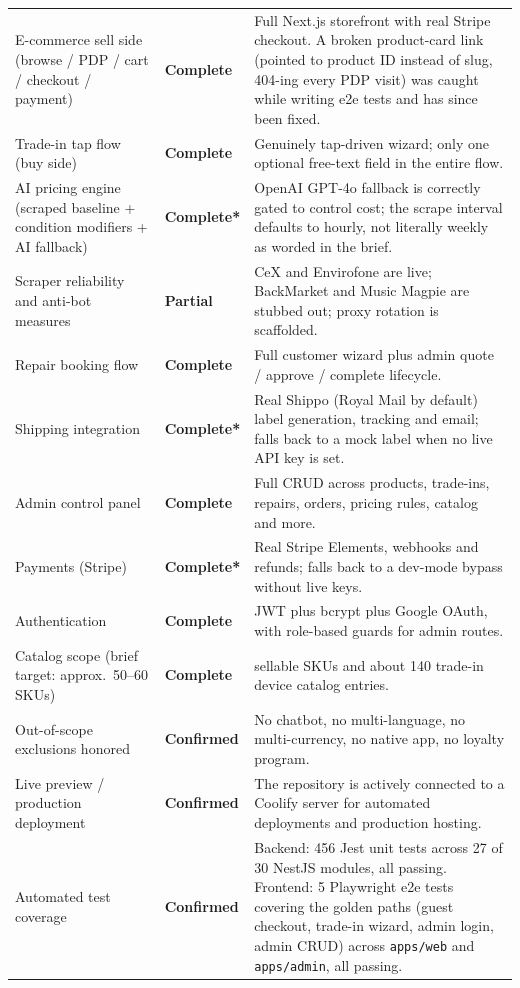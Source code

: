 \documentclass[11pt,a4paper]{article}
\newcommand{\stOK}{\textcolor{OKgreen}{\textbf{Complete}}}
\newcommand{\stOKc}{\textcolor{OKgreen}{\textbf{Complete*}}}
\newcommand{\stPartial}{\textcolor{Amber}{\textbf{Partial}}}
\newcommand{\stConfirmed}{\textcolor{OKgreen}{\textbf{Confirmed}}}
\begin{document}
\begin{longtable}{>{\raggedright\arraybackslash}p{5.0cm}
                   >{\centering\arraybackslash}p{2.2cm}
                   >{\raggedright\arraybackslash}p{7.4cm}}
E-commerce sell side (browse / PDP / cart / checkout / payment) & \stOK & Full Next.js storefront with real Stripe checkout. A broken product-card link (pointed to product ID instead of slug, 404-ing every PDP visit) was caught while writing e2e tests and has since been fixed. \\[4pt]
Trade-in tap flow (buy side) & \stOK & Genuinely tap-driven wizard; only one optional free-text field in the entire flow. \\[4pt]
AI pricing engine (scraped baseline + condition modifiers + AI fallback) & \stOKc & OpenAI GPT-4o fallback is correctly gated to control cost; the scrape interval defaults to hourly, not literally weekly as worded in the brief. \\[4pt]
Scraper reliability and anti-bot measures & \stPartial & CeX and Envirofone are live; BackMarket and Music Magpie are stubbed out; proxy rotation is scaffolded. \\[4pt]
Repair booking flow & \stOK & Full customer wizard plus admin quote / approve / complete lifecycle. \\[4pt]
Shipping integration & \stOKc & Real Shippo (Royal Mail by default) label generation, tracking and email; falls back to a mock label when no live API key is set. \\[4pt]
Admin control panel & \stOK & Full CRUD across products, trade-ins, repairs, orders, pricing rules, catalog and more. \\[4pt]
Payments (Stripe) & \stOKc & Real Stripe Elements, webhooks and refunds; falls back to a dev-mode bypass without live keys. \\[4pt]
Authentication & \stOK & JWT plus bcrypt plus Google OAuth, with role-based guards for admin routes. \\[4pt]
Catalog scope (brief target: approx.\ 50--60 SKUs) & \stOK & 118 sellable SKUs and about 140 trade-in device catalog entries. \\[4pt]
Out-of-scope exclusions honored & \stConfirmed & No chatbot, no multi-language, no multi-currency, no native app, no loyalty program. \\[4pt]
Live preview / production deployment & \stConfirmed & The repository is actively connected to a Coolify server for automated deployments and production hosting. \\[4pt]
Automated test coverage & \stConfirmed & Backend: 456 Jest unit tests across 27 of 30 NestJS modules, all passing. Frontend: 5 Playwright e2e tests covering the golden paths (guest checkout, trade-in wizard, admin login, admin CRUD) across \texttt{apps/web} and \texttt{apps/admin}, all passing. \\

\end{longtable}
\end{document}
